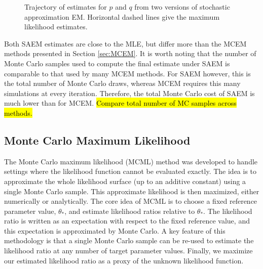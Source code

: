 \documentclass[11pt, oneside]{article}   	%
\begin{document}
\begin{figure}
    \centering
    \caption{Trajectory of estimates for $p$ and $q$ from two versions of stochastic approximation EM. Horizontal dashed lines give the maximum likelihood estimates.}

    
    \label{fig:blood_SAEM_traj}
\end{figure}


Both SAEM estimates are close to the MLE, but differ more than the MCEM methods presented in Section \ref{sec:MCEM}. It is worth noting that the number of Monte Carlo samples used to compute the final estimate under SAEM is comparable to that used by many MCEM methods. For SAEM however, this is the total number of Monte Carlo draws, whereas MCEM requires this many simulations at every iteration. Therefore, the total Monte Carlo cost of SAEM is much lower than for MCEM. \hl{Compare total number of MC samples across methods.}




\subsection{Monte Carlo Maximum Likelihood}
\label{sec:MCML}

The Monte Carlo maximum likelihood (MCML) method was developed to handle settings where the likelihood function cannot be evaluated exactly. The idea is to approximate the whole likelihood surface (up to an additive constant) using a single Monte Carlo sample. This approximate likelihood is then maximized, either numerically or analytically. The core idea of MCML is to choose a fixed reference parameter value, $\theta_*$, and estimate likelihood ratios relative to $\theta_*$. The likelihood ratio is written as an expectation with respect to the fixed reference value, and this expectation is approximated by Monte Carlo. A key feature of this methodology is that a single Monte Carlo sample can be re-used to estimate the likelihood ratio at any number of target parameter values. Finally, we maximize our estimated likelihood ratio as a proxy of the unknown likelihood function.
\end{document}
